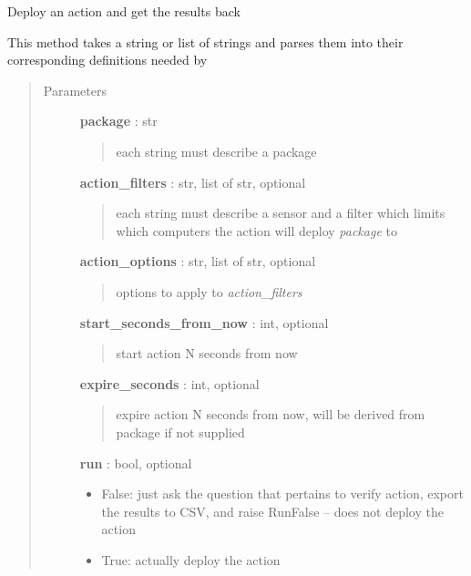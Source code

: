 \documentclass[letterpaper,10pt,english]{sphinxmanual}
\begin{document}

\begin{fulllineitems}
\label{pytan.handler:pytan.handler.Handler.deploy_action_human}
Deploy an action and get the results back

This method takes a string or list of strings and parses them into
their corresponding definitions needed by {\hyperref[pytan.handler:pytan.handler.Handler.deploy_action]{}}
\begin{quote}\begin{description}
\item[{Parameters}] \leavevmode
\textbf{package} : str
\begin{quote}

each string must describe a package
\end{quote}

\textbf{action\_filters} : str, list of str, optional
\begin{quote}

each string must describe a sensor and a filter which limits which computers the action will deploy \emph{package} to
\end{quote}

\textbf{action\_options} : str, list of str, optional
\begin{quote}

options to apply to \emph{action\_filters}
\end{quote}

\textbf{start\_seconds\_from\_now} : int, optional
\begin{quote}

start action N seconds from now
\end{quote}

\textbf{expire\_seconds} : int, optional
\begin{quote}

expire action N seconds from now, will be derived from package if not supplied
\end{quote}

\textbf{run} : bool, optional
\begin{itemize}
\item {} 
False: just ask the question that pertains to verify action, export the results to CSV, and raise RunFalse -- does not deploy the action

\item {} 
True: actually deploy the action


\end{itemize}
\end{description}
\end{quote}
\end{fulllineitems}
\end{document}
